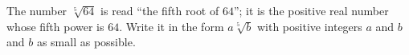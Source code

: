 The number $\sqrt[5]{64}$ is read ``the fifth root of $64$''; it is the positive real number whose fifth power is $64$. Write it in the form $a\sqrt[5]{b}$ with positive integers $a$ and $b$ and $b$ as small as possible.

